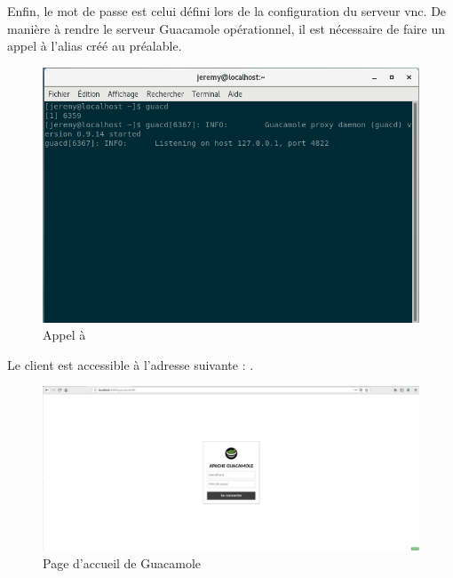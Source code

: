 Enfin, le mot de passe est celui défini lors de la configuration du serveur \acrshort{vnc}.
\newline
De manière à rendre le serveur Guacamole opérationnel, il est nécessaire de faire un appel à l'alias créé au préalable.
\begin{figure}[H]
	\centering
	\includegraphics[scale=0.55]{images/guacd.png}
	\caption{Appel à }
	\label{fig:guacd}
\end{figure}

Le client est accessible à l'adresse suivante : .
\begin{figure}[H]
	\centering
	\includegraphics[scale=0.2]{images/guacd_client.png}
	\caption{Page d'accueil de Guacamole}
	\label{fig:guacd_client}
\end{figure}

